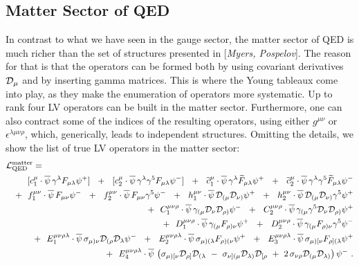 \documentclass[12pt]{revtex4}
\newcommand{\wt}{\widetilde}
\newcommand{\ov}{\overline}
\newcommand{\md}{\mathcal{D}}
\begin{document}
\subsection{Matter Sector of QED}

	In contrast to what we have seen in the gauge sector, 
	the matter sector of QED is much
	richer than the set of structures presented in [{\it Myers, Pospelov}].
	The reason for that is that the operators can be formed both
	by using covariant derivatives $ \cal{D}_\mu $ and by 
	inserting gamma matrices.
	This is where the Young tableaux come into play,
	as they make the enumeration of operators more systematic.
	Up to rank four LV operators can be built in the matter sector.
	Furthermore, one can also contract some of the indices of the
	resulting operators, using either $ g^{\mu\nu} $ or $ \epsilon^{\lambda\mu\nu\rho} $,
	which, generically, leads to independent structures.
	Omitting the details, we show the list of true LV operators
	in the matter sector:
\begin{eqnarray}
\nonumber
\lefteqn{
	\mathcal{L}_{\rm QED}^{\rm matter} = 
	}
	\\
\nonumber
	&&
	\phantom{+~~}
	[c_1^{\mu}\cdot
	\ov{\psi}\, \gamma^\lambda F_{\mu\lambda} \psi {}^{+}] ~~+~~
	[c_2^{\mu}\cdot
	\ov{\psi}\, \gamma^\lambda \gamma^5 F_{\mu\lambda} \psi {}^{-}] ~~+~~
	\wt{c}_1^{\mu}\cdot
	\ov{\psi}\, \gamma^\lambda \wt{F}_{\mu\lambda} \psi {}^{+} ~~+~~
	\wt{c}_2^{\mu}\cdot
	\ov{\psi}\, \gamma^\lambda \gamma^5 \wt{F}_{\mu\lambda} \psi {}^{-}
	\\
\nonumber
	&&
	+~~
	f_1^{\mu\nu}\cdot
	\ov{\psi}\, F_{\mu\nu} \psi {}^{-} ~~+~~
	f_2^{\mu\nu}\cdot
	\ov{\psi}\, F_{\mu\nu} \gamma^5 \psi {}^{-} ~~+~~
	h_1^{\mu\nu}\cdot
	\ov{\psi}\, \mathcal{D}_{(\mu} \mathcal{D}_{\nu)} \psi {}^{+} ~~+~~
	h_2^{\mu\nu}\cdot
	\ov{\psi}\, \mathcal{D}_{(\mu} \mathcal{D}_{\nu)} \gamma^5 \psi {}^{+} 
	\\
\label{QED_matter}
	&&
	+~~
	C_1^{\mu\nu\rho}\cdot
	\ov{\psi}\, \gamma_{(\mu} 
		\mathcal{D}_\nu \mathcal{D}_{\rho)} \psi {}^{-} ~~+~~
	C_2^{\mu\nu\rho}\cdot
	\ov{\psi}\, \gamma_{(\mu} \gamma^5
	\mathcal{D}_\nu \mathcal{D}_{\rho)} \psi {}^{+} 
	\\
\nonumber
	&&
	+~~
	D_1^{\mu\nu\rho}\cdot
	\ov{\psi}\, \gamma_{(\mu} F_{\rho)\nu} \psi {}^{+} ~~+~~
	D_2^{\mu\nu\rho}\cdot
	\ov{\psi}\, \gamma_{(\mu} F_{\rho)\nu} \gamma^5 \psi {}^{-} 
	\\
\nonumber
	&&
	+~~
	E_1^{\mu\nu\rho\lambda}\cdot
	\ov{\psi}\, \sigma_{\mu)\nu} \mathcal{D}_{(\rho}\mathcal{D}_\lambda 
			\psi {}^{-} ~~+~~
	E_2^{\mu\nu\rho\lambda}\cdot
	\ov{\psi}\, \sigma_{\mu)(\lambda} F_{\rho)(\nu} \psi {}^{+} ~~+~~
	E_3^{\mu\nu\rho\lambda}\cdot
	\ov{\psi}\, \sigma_{\mu)[\nu} F_{\rho](\lambda} \psi {}^{+} 
	\\
\nonumber
	&&
	+~~
	E_4^{\mu\nu\rho\lambda}\cdot
	\ov{\psi}\, \left ( 
		\sigma_{\mu)[\nu} \mathcal{D}_{\rho]}\mathcal{D}_{(\lambda}
		~-~
		\sigma_{\nu](\mu} \mathcal{D}_{\lambda)}\mathcal{D}_{[\rho}
		~+~
		2\, \sigma_{\nu\rho} \md_{(\mu} \md_{\lambda)}
		\right ) \psi {}^{-} 
	~.
\end{eqnarray}
\end{document}
